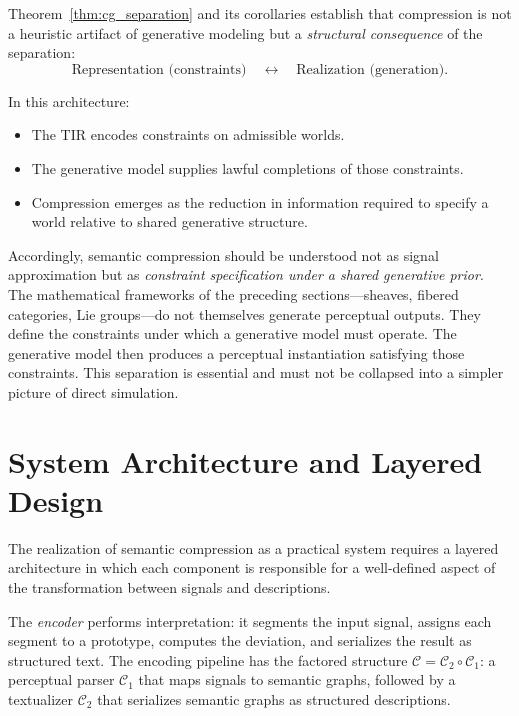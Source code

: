\documentclass[11pt,a4paper]{article}
\theoremstyle{definition}
\theoremstyle{remark}
\begin{document}
Theorem~\ref{thm:cg_separation} and its corollaries establish that compression is not a heuristic artifact of generative modeling but a \emph{structural consequence} of the separation:
\[
\text{Representation (constraints)} \quad \longleftrightarrow \quad \text{Realization (generation)}.
\]

In this architecture:
\begin{itemize}[noitemsep]
\item The TIR encodes constraints on admissible worlds.
\item The generative model supplies lawful completions of those constraints.
\item Compression emerges as the reduction in information required to specify a world relative to shared generative structure.
\end{itemize}

Accordingly, semantic compression should be understood not as signal approximation but as \emph{constraint specification under a shared generative prior}. The mathematical frameworks of the preceding sections---sheaves, fibered categories, Lie groups---do not themselves generate perceptual outputs. They define the constraints under which a generative model must operate. The generative model then produces a perceptual instantiation satisfying those constraints. This separation is essential and must not be collapsed into a simpler picture of direct simulation.

\section{System Architecture and Layered Design}
\label{sec:architecture}

The realization of semantic compression as a practical system requires a layered architecture in which each component is responsible for a well-defined aspect of the transformation between signals and descriptions.

The \emph{encoder} performs interpretation: it segments the input signal, assigns each segment to a prototype, computes the deviation, and serializes the result as structured text. The encoding pipeline has the factored structure $\mathcal{C} = \mathcal{C}_2 \circ \mathcal{C}_1$: a perceptual parser $\mathcal{C}_1$ that maps signals to semantic graphs, followed by a textualizer $\mathcal{C}_2$ that serializes semantic graphs as structured descriptions.
\end{document}

